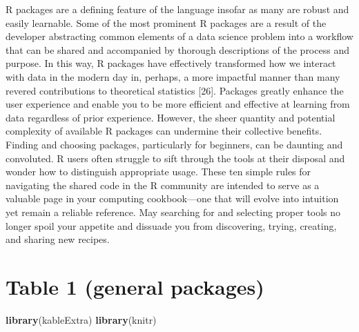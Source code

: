 \documentclass[10pt,letterpaper]{article}
\newenvironment{Shaded}{\begin{snugshade}}{\end{snugshade}}
\newcommand{\KeywordTok}[1]{\textcolor[rgb]{0.13,0.29,0.53}{\textbf{#1}}}
\newcommand{\NormalTok}[1]{#1}
\begin{document}
R packages are a defining feature of the language insofar as many are
robust and easily learnable. Some of the most prominent R packages are a
result of the developer abstracting common elements of a data science
problem into a workflow that can be shared and accompanied by thorough
descriptions of the process and purpose. In this way, R packages have
effectively transformed how we interact with data in the modern day in,
perhaps, a more impactful manner than many revered contributions to
theoretical statistics {[}26{]}. Packages greatly enhance the user
experience and enable you to be more efficient and effective at learning
from data regardless of prior experience. However, the sheer quantity
and potential complexity of available R packages can undermine their
collective benefits. Finding and choosing packages, particularly for
beginners, can be daunting and convoluted. R users often struggle to
sift through the tools at their disposal and wonder how to distinguish
appropriate usage. These ten simple rules for navigating the shared code
in the R community are intended to serve as a valuable page in your
computing cookbook---one that will evolve into intuition yet remain a
reliable reference. May searching for and selecting proper tools no
longer spoil your appetite and dissuade you from discovering, trying,
creating, and sharing new recipes.

\hypertarget{table-1-general-packages}{%
\section{Table 1 (general packages)}\label{table-1-general-packages}}

\begin{Shaded}
\begin{Highlighting}[]
\KeywordTok{library}\NormalTok{(kableExtra)}
\KeywordTok{library}\NormalTok{(knitr)}
\end{Highlighting}
\end{Shaded}
\end{document}
